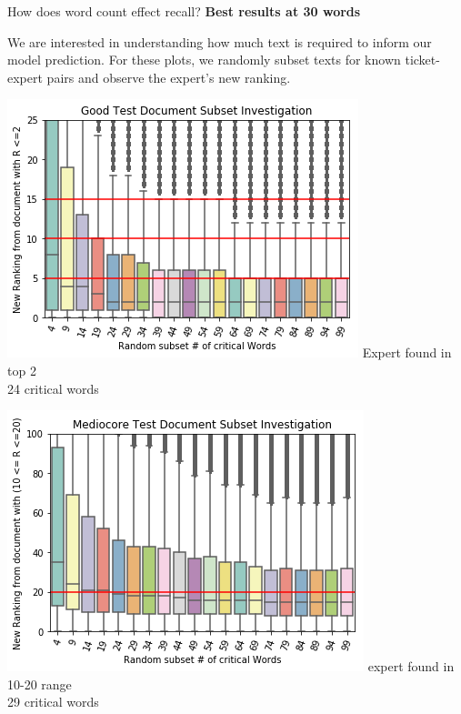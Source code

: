 \documentclass[10pt]{beamer}
\begin{document}
\begin{frame}{How does word count effect recall?}
  {\bf Best results at 30 words}

  We are interested in understanding how much text is required to inform
  our model prediction. For these plots, we randomly subset texts for
  known ticket-expert pairs and observe the expert's new ranking.

  \begin{multicols}{2}
    \includegraphics[width=\columnwidth]{low-ranked-downsample.png}
    Expert found in top 2\\
    24 critical words

    \includegraphics[width=\columnwidth]{mid-ranked-downsample.png}
    expert found in 10-20 range\\
    29 critical words
  \end{multicols}
\end{frame}
\end{document}
